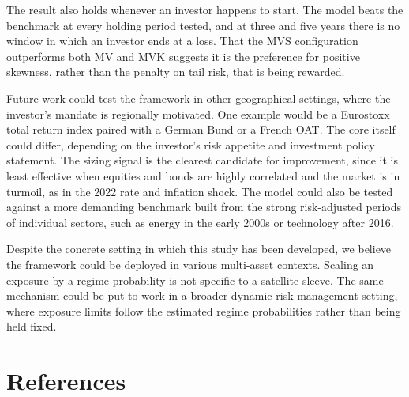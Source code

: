 \documentclass[11pt, a4paper]{article}
\begin{document}
The result also holds whenever an investor happens to start. The model beats the benchmark at
every holding period tested, and at three and five years there is no window in which an
investor ends at a loss. That the MVS configuration outperforms both MV and MVK suggests it is
the preference for positive skewness, rather than the penalty on tail risk, that is being
rewarded.

Future work could test the framework in other geographical settings, where the investor's
mandate is regionally motivated. One example would be a Eurostoxx total return index paired
with a German Bund or a French OAT. The core itself could differ, depending on the investor's
risk appetite and investment policy statement. The sizing signal is the clearest candidate for
improvement, since it is least effective when equities and bonds are highly correlated and the
market is in turmoil, as in the 2022 rate and inflation shock. The model could also be tested
against a more demanding benchmark built from the strong risk-adjusted periods of individual
sectors, such as energy in the early 2000s or technology after 2016.

Despite the concrete setting in which this study has been developed, we believe the framework
could be deployed in various multi-asset contexts. Scaling an exposure by a regime probability
is not specific to a satellite sleeve. The same mechanism could be put to work in a broader
dynamic risk management setting, where exposure limits follow the estimated regime
probabilities rather than being held fixed.

\section*{References}
\end{document}
